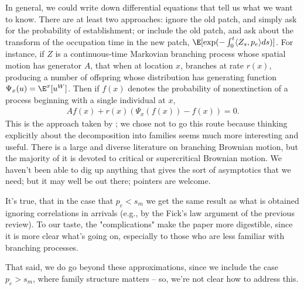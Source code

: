 \reply
In general, we could write down differential equations
that tell us what we want to know.
There are at least two approaches: 
ignore the old patch, and simply ask for the probability of establishment;
or include the old patch, and ask about the transform of the occupation time in the new patch,
$\E[\exp(-\int_0^t \langle Z_s, p_e \rangle ds)]$.
For instance,
if $Z$ is a continuous-time Markovian branching process
whose spatial motion has generator $A$,
that when at location $x$, branches at rate $r(x)$,
producing a number of 
offspring whose distribution has generating function $\Psi_x(u)=\E^x[u^W]$.
Then if $f(x)$ denotes the probability of nonextinction
of a process beginning with a single individual at $x$,
\begin{align*}
    Af(x) + r(x) (\Psi_x(f(x))-f(x)) = 0 .
\end{align*}
This is the approach taken by \citep{barton1987establishment};
we chose not to go this route because thinking explicitly about the decomposition into families
seems much more interesting and useful.
There is a large and diverse literature on branching Brownian motion,
but the majority of it is devoted to critical or supercritical Brownian motion.
We haven't been able to dig up anything that gives the sort of asymptotics that we need;
but it may well be out there; pointers are welcome.



\reply
It's true, that in the case that $p_e < s_m$ we get the same result
as what is obtained ignoring correlations in arrivals
(e.g., by the Fick's law argument of the previous review).
To our taste, the "complications" make the paper more digestible,
since it is more clear what's going on,
especially to those who are less familiar with branching processes.

That said, we do go beyond these approximations, since we include the case $p_e > s_m$,
where family structure matters --
so, we're not clear how to address this.



